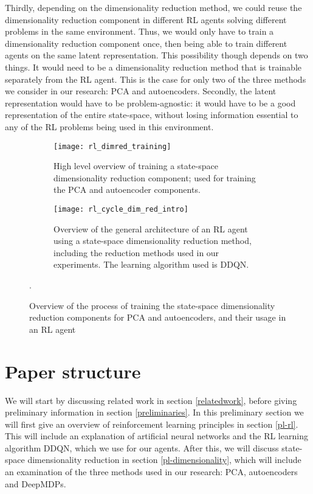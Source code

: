 Thirdly, depending on the dimensionality reduction method, we could reuse the dimensionality reduction component in different RL agents solving different problems in the same environment. Thus, we would only have to train a dimensionality reduction component once, then being able to train different agents on the same latent representation. This possibility though depends on two things. It would need to be a dimensionality reduction method that is trainable separately from the RL agent. This is the case for only two of the three methods we consider in our research: PCA and autoencoders. Secondly, the latent representation would have to be problem-agnostic: it would have to be a good representation of the entire state-space, without losing information essential to any of the RL problems being used in this environment.


\begin{figure}[h]
	\centering
	\begin{subfigure}[b]{0.20 \textwidth}
		\texttt{[image: rl\_dimred\_training]}
		\caption{High level overview of training a state-space dimensionality reduction component; used for training the PCA and autoencoder components.}
		\label{fig:rl_training}
	\end{subfigure}\hfill
	\begin{subfigure}[b]{0.50\textwidth}
		\texttt{[image: rl\_cycle\_dim\_red\_intro]}
    		\caption{Overview of the general architecture of an RL agent using a state-space dimensionality reduction method, including the reduction methods used in our experiments. The learning algorithm used is DDQN.}
    		\label{fig:rl_cycle_dimred}
	\end{subfigure}
	\caption{Overview of the process of training the state-space dimensionality reduction components for PCA and autoencoders, and their usage in an RL agent}.
\end{figure}
	

\section{Paper structure}
We will start by discussing related work in section \ref{relatedwork}, before giving preliminary information in section \ref{preliminaries}. In this preliminary section we will first give an overview of reinforcement learning principles in section \ref{pl-rl}. This will include an explanation of artificial neural networks and the RL learning algorithm DDQN, which we use for our agents. After this, we will discuss state-space dimensionality reduction in section \ref{pl-dimensionality}, which will include an examination of the three methods used in our research: PCA, autoencoders and DeepMDPs.

